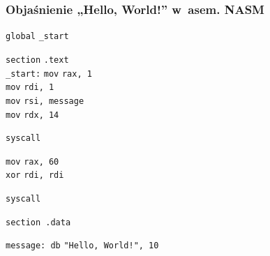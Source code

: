 \documentclass[10pt,t]{beamer}
\begin{document}
\begin{frame}
  \frametitle{Objaśnienie „Hello, World!” w~asem. NASM
    \parencite{Toal-NASM-Tutorial-Ver-2024}}


  \hphantom{aaaaaaaaa} \texttt{global} \hphantom{aa} \texttt{\_start} \\
  \vspace{0.8em}

  \hphantom{aaaaaaaaa} \texttt{section} \hphantom{a} \texttt{.text} \\
  \texttt{\_start:} \hphantom{a} \hspace{-0.14em}
  \texttt{mov} \hphantom{aaaaaa} \texttt{rax, 1} \\
  \hphantom{aaaaaaaaa} \texttt{mov} \hphantom{aaaaaa} \texttt{rdi, 1} \\
  \hphantom{aaaaaaaaa} \texttt{mov} \hphantom{aaaaaa}
  \texttt{rsi, message} \\
  \hphantom{aaaaaaaaa} \texttt{mov} \hphantom{aaaaaa} \texttt{rdx, 14} \\
  \vspace{0.8em}

  \hphantom{aaaaaaaaa} \texttt{syscall} \\
  \vspace{0.8em}

  \hphantom{aaaaaaaaa} \texttt{mov} \hphantom{aaaaaa} \texttt{rax, 60} \\
  \hphantom{aaaaaaaaa} \texttt{xor} \hphantom{aaaaaa} \texttt{rdi, rdi} \\
  \vspace{0.8em}

  \hphantom{aaaaaaaaa} \texttt{syscall} \\
  \vspace{0.8em}

  \hphantom{aaaaaaaaa} \texttt{section .data} \\
  \vspace{0.8em}

  \texttt{message: db} \hphantom{aaaaa} \texttt{"Hello, World!", 10}

\end{frame}
\end{document}
